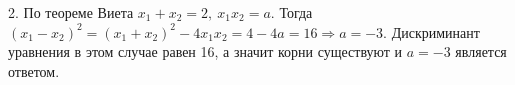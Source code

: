 2. По теореме Виета $x_1+x_2=2,\ x_1x_2=a.$ Тогда $(x_1-x_2)^2=(x_1+x_2)^2-4x_1x_2=4-4a=16\Rightarrow a=-3.$ Дискриминант уравнения в этом случае равен 16, а значит корни существуют и $a=-3$ является ответом.\\
